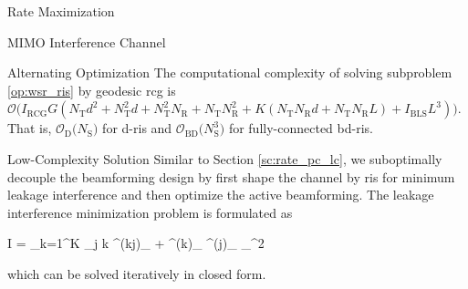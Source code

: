 \documentclass[journal]{IEEEtran}
\begin{document}
\begin{section}{Rate Maximization}
\begin{subsection}{MIMO Interference Channel}
\begin{subsubsection}{Alternating Optimization}
				The computational complexity of solving subproblem \eqref{op:wsr_ris} by geodesic \gls{rcg} is $\mathcal{O}\bigl(I_\text{RCG} G (N_\mathrm{T} d^2 + N_\mathrm{T}^2 d + N_\mathrm{T}^2 N_\mathrm{R} + N_\mathrm{T} N_\mathrm{R}^2 + K (N_\mathrm{T} N_\mathrm{R} d + N_\mathrm{T} N_\mathrm{R} L) + I_\text{BLS}L^3)\bigr)$.
				That is, $\mathcal{O}_\mathrm{D}\bigl(N_\mathrm{S}\bigr)$ for \gls{d}-\gls{ris} and $\mathcal{O}_\mathrm{BD}\bigl(N_\mathrm{S}^3\bigr)$ for fully-connected \gls{bd}-\gls{ris}.
			\end{subsubsection}

			\begin{subsubsection}{Low-Complexity Solution}
				Similar to Section \ref{sc:rate_pc_lc}, we suboptimally decouple the beamforming design by first shape the channel by \gls{ris} for minimum leakage interference and then optimize the active beamforming.
				The leakage interference minimization problem is formulated as
				\begin{mini!}
					{\scriptstyle{\mathbf{\Theta}}}{I = \sum_{k=1}^K \sum_{j \ne k} \left{}^{(kj)}_ + {}^{(k)}_ \mathbf{\Theta} {}^{(j)}_\mathrm{F} \right\rVert _{}^2}{\label{op:interference}}{\label{ob:interference}}
				\end{mini!}
				which can be solved iteratively in closed form.


\end{subsubsection}
\end{subsection}
\end{section}
\end{document}
